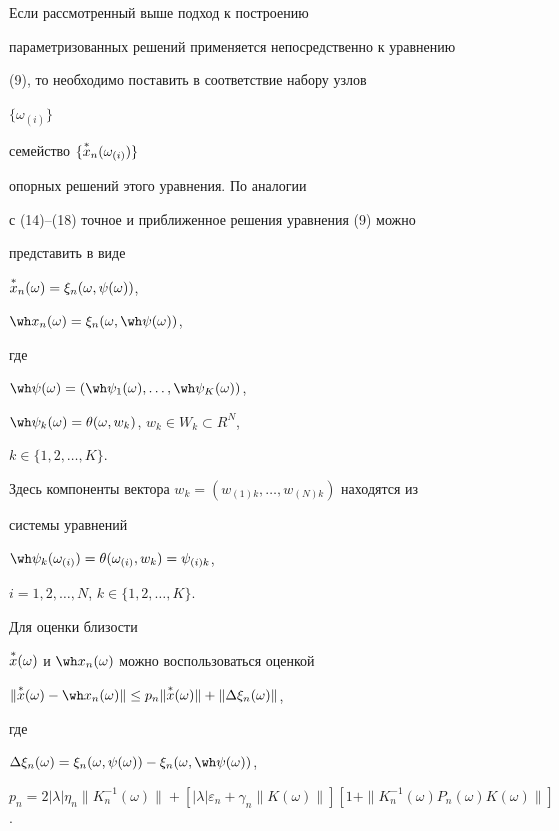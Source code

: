 \begin{note} Если рассмотренный выше подход к построению


параметризованных решений применяется непосредственно к уравнению


(9), то необходимо поставить в соответствие набору узлов


$\{\omega_{(i)}\}$


семейство $\{\overset{*}{x}{}_n(\omega_{(i)})\}$


опорных решений этого уравнения. По аналогии


с (14)--(18) точное и приближенное решения уравнения (9) можно


представить в виде


$\overset{*}{x}{}_n(\omega)=\xi_n(\omega,\psi(\omega))$,


$\wh x_n(\omega)=\xi_n(\omega,\wh\psi(\omega))$,


где


$\wh\psi(\omega)=(\wh\psi_1(\omega),\dotsc,\wh\psi_K(\omega))$,


$\wh\psi_k(\omega)=\theta(\omega,w_k)$, $w_k\in{}W_k\subset R^N$,


$k\in\{1,2,\dotsc,K\}$.


Здесь компоненты вектора $w_k=(w_{(1)k},\dotsc,w_{(N)k})$ находятся из


системы уравнений


$\wh\psi_k(\omega_{(i)})=\theta(\omega_{(i)},w_k)=\psi_{(i)k}$,


$i=1,2,\dotsc,N$, $k\in\{1,2,\dotsc,K\}$.


Для оценки близости


$\overset{*}{x}{}(\omega)$ и $\wh x_n(\omega)$ можно воспользоваться оценкой


$\|\up{*}{x}(\omega)-\wh x_n(\omega)\|\le p_n


\|\up{*}{x}(\omega)\|+\|\Delta\xi_n(\omega)\|$,


где


$\Delta\xi_n(\omega)=\xi_n(\omega,\psi(\omega))-


\xi_n(\omega,\wh\psi(\omega))$,


$p_n=2|\lambda|\eta_n\|K^{-1}_n(\omega)\|+


[|\lambda|\varepsilon_n+\gamma_n\|K(\omega)\|]


[1+\|K^{-1}_n(\omega)P_n(\omega)K(\omega)\|]$.


\end{note}





